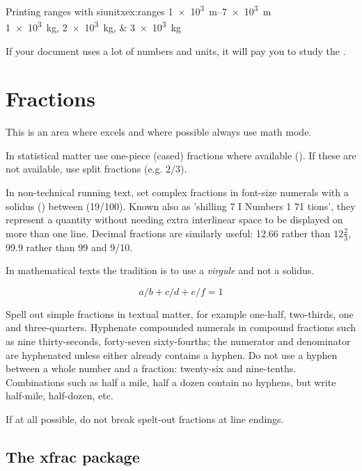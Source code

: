 \begin{texexample}{Printing ranges with siunitx}{ex:ranges}
  \SIrange{1e3}{7e3}{\metre} \\
  \SIlist{1e3;2e3;3e3}{\kg}
\end{texexample}

If your document uses a lot of numbers and units, it will pay you to study the .

\section{Fractions}

This is an area where \tex excels and where possible always use math mode.

In statistical matter use one-piece (cased) fractions where available (\textonehalf). If these are not available, use split fractions (e.g. $2/3$).

In non-technical running text, set complex fractions in font-size numerals
with a solidus (\thinspace\textfractionsolidus\thinspace) between (19/100). Known also as 'shilling 
7 I Numbers 1 71
tions', they represent a quantity without needing extra interlinear space
to be displayed on more than one line. Decimal fractions are similarly
useful: 12.66 rather than $12\frac{2}{3}$, 99.9 rather than 99 and 9/10.

In mathematical texts the tradition is to use a \textit{virgule} and not a solidus.

\[ a/b + c/d + e/f = 1\]

Spell out simple fractions in textual matter, for example one-half, two-thirds,
one and three-quarters. Hyphenate compounded numerals in compound
fractions such as nine thirty-seconds, forty-seven sixty-fourths; the
numerator and denominator are hyphenated unless either already contains
a hyphen. Do not use a hyphen between a whole number and a
fraction: twenty-six and nine-tenths. Combinations such as half a mile, half a
dozen contain no hyphens, but write half-mile, half-dozen, etc. 

If at all possible, do not break spelt-out fractions at line endings.

\subsection{The xfrac package}

